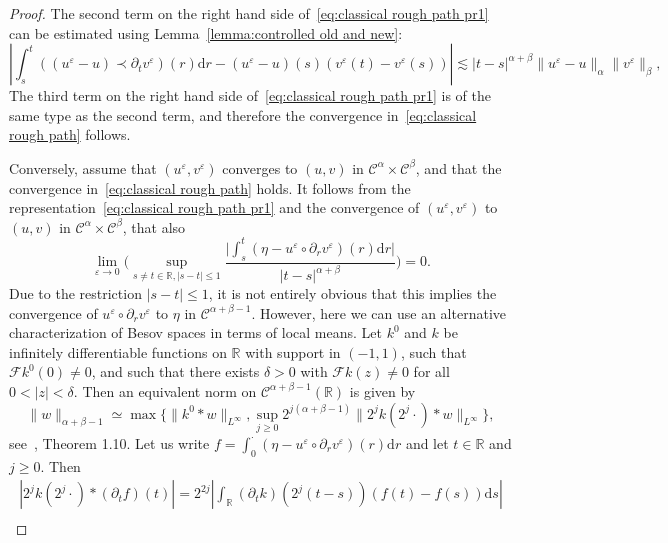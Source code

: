 \documentclass[11pt,a4paper]{article}
\newcommand{\cdummy}{\cdot}
\newcommand{\mathd}{\mathrm{d}}
\theoremstyle{remark}
\newcommand{\CC}{\ensuremath{\mathscr{C}}}
\begin{document}
\begin{proof}
  The second term on the right hand side of~{\eqref{eq:classical rough path pr1}} can be estimated using Lemma~\ref{lemma:controlled old and new}:
  \[
     \left| \int_{s}^{t} ( ( u^{\varepsilon} -u ) \prec \partial_{t} v^{\varepsilon} ) ( r ) \mathd r- ( u^{\varepsilon} -u ) ( s ) ( v^{\varepsilon} ( t ) -v^{\varepsilon} ( s ) ) \right| \lesssim | t-s |^{\alpha + \beta} \| u^{\varepsilon} -u \|_{\alpha} \| v^{\varepsilon} \|_{\beta},
  \]
  The third term on the right hand side of~{\eqref{eq:classical rough path pr1}} is of the same type as the second term, and therefore the convergence
  in~{\eqref{eq:classical rough path}} follows.
  
  Conversely, assume that $( u^{\varepsilon} ,v^{\varepsilon} )$ converges to
  $( u,v )$ in $\CC^{\alpha} \times \CC^\beta$, and that the
  convergence in~{\eqref{eq:classical rough path}} holds. It follows from the
  representation~{\eqref{eq:classical rough path pr1}} and the
  convergence of $( u^{\varepsilon} ,v^{\varepsilon} )$ to $( u,v )$ in
  $\CC^{\alpha} \times \CC^\beta$, that also
  \[
     \lim_{\varepsilon \rightarrow 0} \Bigg( \sup_{s \neq t \in \mathbb{R}, | s-t | \leqslant 1} \frac{\big| \int_{s}^{t} ( \eta -u^{\varepsilon} \circ \partial_{r} v^{\varepsilon} ) ( r ) \mathd r \big|}{| t-s |^{\alpha + \beta}} \Bigg) =0.
  \]
  Due to the restriction $| s-t | \leqslant 1$, it is not entirely obvious
  that this implies the convergence of $u^{\varepsilon} \circ \partial_{r} v^{\varepsilon}$ to $\eta$ in $\CC^{\alpha + \beta -1}$. However, here
  we can use an alternative characterization of Besov spaces in terms of
  local means. Let $k^{0}$ and $k$ be infinitely differentiable functions on
  $\mathbb{R}$ with support in $( -1,1 )$, such that $\mathcal{F}k^{0} (0 ) \neq 0$, and such that there exists $\delta >0$ with $\mathcal{F}k ( z ) \neq 0$ for all $0< | z | < \delta$. Then an equivalent norm on $\CC^{\alpha + \beta -1} ( \mathbb{R} )$ is given by
  \[
     \| w \|_{\alpha + \beta -1} \simeq \max \Big\{ \| k^{0} \ast w \|_{L^{\infty}} , \sup_{j \geqslant 0}  2^{j ( \alpha + \beta -1 )} \| 2^{j} k ( 2^{j}  \cdummy ) \ast w \|_{L^{\infty}} \Big\} ,
  \]
  see~\cite{Triebel2006}, Theorem 1.10. Let us write $f= \int_{0}^{\cdummy} (\eta -u^{\varepsilon} \circ \partial_{r} v^{\varepsilon} ) ( r ) \mathd r$
  and let $t \in \mathbb{R}$ and $j \ge 0$. Then
  \begin{gather*}
     | 2^{j} k ( 2^{j} \cdummy ) \ast (\partial_t f) ( t ) | = 2^{2j} \left| \int_{\mathbb{R}} (\partial_{t} k) (2^j (t-s) ) ( f ( t ) -f ( s ) ) \mathd s \right| \\

\end{gather*}
\end{proof}
\end{document}
